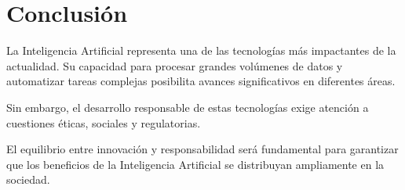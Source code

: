 \section{Conclusión}

La Inteligencia Artificial representa una de las tecnologías más impactantes de la actualidad. Su capacidad para procesar grandes volúmenes de datos y automatizar tareas complejas posibilita avances significativos en diferentes áreas.

Sin embargo, el desarrollo responsable de estas tecnologías exige atención a cuestiones éticas, sociales y regulatorias.

El equilibrio entre innovación y responsabilidad será fundamental para garantizar que los beneficios de la Inteligencia Artificial se distribuyan ampliamente en la sociedad.  